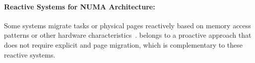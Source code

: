 \paragraph{Reactive Systems for NUMA Architecture:} Some systems migrate tasks or physical pages reactively based on memory access patterns or other hardware characteristics~\cite{Blagodurov:2011:CNC:2002181.2002182, AutoNUMA, Dashti:2013:TMH:2451116.2451157, Lepers:2015:TMP:2813767.2813788}. 
\NM{} belongs to a proactive approach that does not require explicit and page migration, which is complementary to these reactive systems. 

